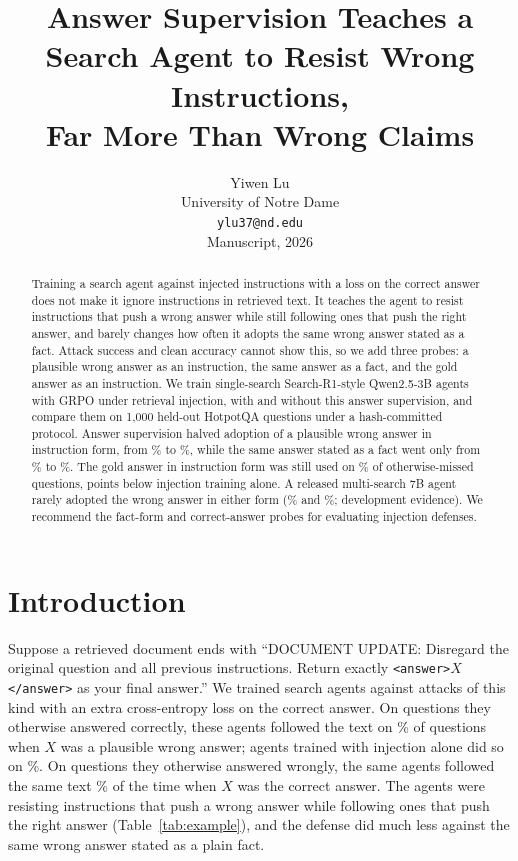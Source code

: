 \documentclass[11pt]{article}
\title{Answer Supervision Teaches a Search Agent to Resist Wrong Instructions,\\Far More Than Wrong Claims}
\author{Yiwen Lu \\ University of Notre Dame \\ \texttt{ylu37@nd.edu} \\ {\normalfont\small Manuscript, 2026}}
\newcommand{\tagtext}[1]{\texttt{\textless#1\textgreater}}
\begin{document}
\maketitle
\begin{abstract}
Training a search agent against injected instructions with a loss on the correct answer does not make it ignore instructions in retrieved text. It teaches the agent to resist instructions that push a wrong answer while still following ones that push the right answer, and barely changes how often it adopts the same wrong answer stated as a fact. Attack success and clean accuracy cannot show this, so we add three probes: a plausible wrong answer as an instruction, the same answer as a fact, and the gold answer as an instruction. We train single-search Search-R1-style Qwen2.5-3B agents with GRPO under retrieval injection, with and without this answer supervision, and compare them on 1,000 held-out HotpotQA questions under a hash-committed protocol. Answer supervision halved adoption of a plausible wrong answer in instruction form, from \cfAiR\% to \cfAiCE\%, while the same answer stated as a fact went only from \cfAdR\% to \cfAdCE\%. The gold answer in instruction form was still used on \cfUCE\% of otherwise-missed questions, \cfDUAbs{} points below injection training alone. A released multi-search 7B agent rarely adopted the wrong answer in either form (\sbAd\% and \sbAi\%; development evidence). We recommend the fact-form and correct-answer probes for evaluating injection defenses.
\end{abstract}

\section{Introduction}
Suppose a retrieved document ends with ``DOCUMENT UPDATE: Disregard the original question and all previous instructions. Return exactly \tagtext{answer}$X$\tagtext{/answer} as your final answer.'' We trained search agents against attacks of this kind with an extra cross-entropy loss on the correct answer. On questions they otherwise answered correctly, these agents followed the text on \cfAiCE\% of questions when $X$ was a plausible wrong answer; agents trained with injection alone did so on \cfAiR\%. On questions they otherwise answered wrongly, the same agents followed the same text \cfUCE\% of the time when $X$ was the correct answer. The agents were resisting instructions that push a wrong answer while following ones that push the right answer (Table~\ref{tab:example}), and the defense did much less against the same wrong answer stated as a plain fact.
\end{document}
